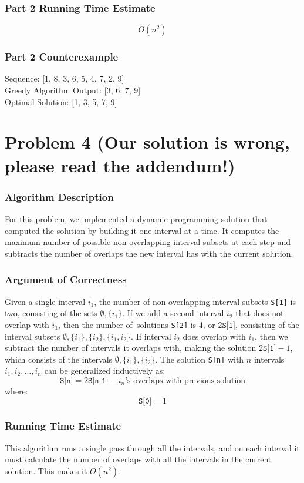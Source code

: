 \documentclass[letterpaper, 12pt]{math}
\begin{document}
\subsubsection*{Part 2 Running Time Estimate}
\[ O(n^2) \]

\subsubsection*{Part 2 Counterexample}
Sequence: [1, 8, 3, 6, 5, 4, 7, 2, 9] \\
Greedy Algorithm Output: [3, 6, 7, 9] \\
Optimal Solution: [1, 3, 5, 7, 9]

\section*{Problem 4 (Our solution is wrong, please read the addendum!)}

\subsubsection*{Algorithm Description}
For this problem, we implemented a dynamic programming solution that computed
the solution by building it one interval at a time. It computes the maximum
number of possible non-overlapping interval subsets at each step and subtracts
the number of overlaps the new interval has with the current solution.

\subsubsection*{Argument of Correctness}
Given a single interval \( i_1 \), the number of non-overlapping interval
subsets \texttt{S[1]} is two, consisting of the sets \( \emptyset,\{i_1\} \).
If we add a second interval \( i_2 \) that does not overlap with \( i_1 \),
then the number of\ solutions \texttt{S[2]} is 4, or \( 2\texttt{S[1]} \),
consisting of the interval subsets \( \emptyset,\{i_1\},\{i_2\},\{i_1,i_2\} \).
If interval \( i_2 \) does overlap with \( i_1 \), then we subtract the number
of intervals it overlaps with, making the solution \( 2\texttt{S[1]}-1 \), which
consists of the intervals \( \emptyset,\{i_1\},\{i_2\} \). The solution
\texttt{S[n]} with \( n \) intervals \( i_1,i_2,\dots,i_n \) can be
generalized inductively as:
\[ \texttt{S[n]} =
  2\texttt{S[n-1]}-i_n\text{'s overlaps with previous solution} \]
where:
\[ \texttt{S[0]} = 1 \]

\subsubsection*{Running Time Estimate}
This algorithm runs a single pass through all the intervals, and on each
interval it must calculate the number of overlaps with all the intervals in
the current solution. This makes it \( O(n^2) \).
\end{document}
